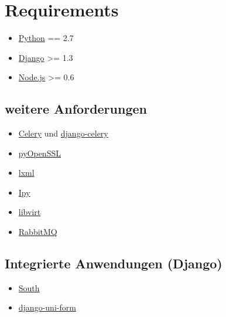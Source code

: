 \documentclass[letterpaper,10pt,english]{sphinxmanual}
\begin{document}
\section{Requirements}
\label{getting-started/requirements:requirements}\label{getting-started/requirements::doc}\begin{itemize}
\item {} 
\href{http://www.python.org/}{Python} == 2.7

\item {} 
\href{http://www.djangoproject.com/}{Django} \textgreater{}= 1.3

\item {} 
\href{http://www.nodejs.org}{Node.js} \textgreater{}= 0.6

\end{itemize}


\subsection{weitere Anforderungen}
\label{getting-started/requirements:weitere-anforderungen}\label{getting-started/requirements:node-js}\begin{itemize}
\item {} 
\href{http://celeryproject.org/}{Celery} und \href{http://docs.celeryproject.org/en/latest/django/index.html}{django-celery}

\item {} 
\href{http://packages.python.org/pyOpenSSL/}{pyOpenSSL}

\item {} 
\href{http://lxml.de/}{lxml}

\item {} 
\href{http://c0re.23.nu/c0de/IPy/}{Ipy}

\item {} 
\href{http://libvirt.org/}{libvirt}

\item {} 
\href{http://www.rabbitmq.com/}{RabbitMQ}

\end{itemize}


\subsection{Integrierte Anwendungen (Django)}
\label{getting-started/requirements:integrierte-anwendungen-django}\label{getting-started/requirements:rabbitmq}\begin{itemize}
\item {} 
\href{http://south.aeracode.org/}{South}

\item {} 
\href{http://django-uni-form.rtfd.org/}{django-uni-form}

\end{itemize}
\end{document}
